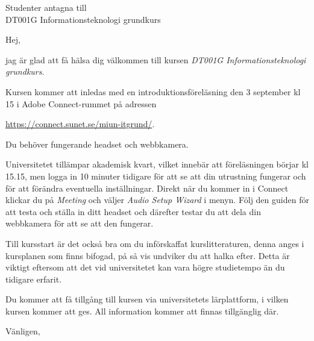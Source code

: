 \documentclass[a4paper,11pt]{miunlett}
\institute{Mittuniversitetet}
\date{Sundsvall, den 7 augusti 2012}
\begin{document}
	\begin{letter}{
		Studenter antagna till\\
		DT001G Informationsteknologi grundkurs
	}
		\opening{Hej,}

		jag är glad att få hälsa dig välkommen till kursen \emph{DT001G 
		Informationsteknologi grundkurs}.

		Kursen kommer att inledas med en introduktionsföreläsning den 3 september 
		kl 15 i Adobe Connect-rummet på adressen
		\begin{center}
			\url{https://connect.sunet.se/miun-itgrund/}.
		\end{center}
		Du behöver fungerande headset och webbkamera.

		Universitetet tillämpar akademisk kvart, vilket innebär att föreläsningen 
		börjar kl 15.15, men logga in 10 minuter tidigare för att se att din 
		utrustning fungerar och för att förändra eventuella inställningar.
		Direkt när du kommer in i Connect klickar du på \emph{Meeting} och väljer 
		\emph{Audio Setup Wizard} i menyn.
		Följ den guiden för att testa och ställa in ditt headset och därefter 
		testar du att dela din webbkamera för att se att den fungerar.

		Till kursstart är det också bra om du införskaffat kurslitteraturen, denna 
		anges i kursplanen som finns bifogad, på så vis undviker du att halka 
		efter.
		Detta är viktigt eftersom att det vid universitetet kan vara högre 
		studietempo än du tidigare erfarit.

		Du kommer att få tillgång till kursen via universitetets lärplattform, 
		i vilken kursen kommer att ges.
		All information kommer att finnas tillgänglig där.


		\closing{Vänligen,}


		
	\end{letter}
\end{document}
